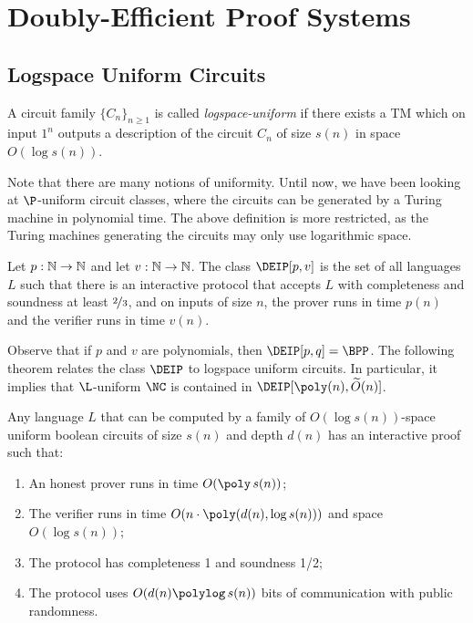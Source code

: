 \newcommand{\fH}{\mathbb{H}}

\chapter{Doubly-Efficient Proof Systems}
\label{lec:09}

\section{Logspace Uniform Circuits}

\begin{definition}\label{def:logspaceuniform}
  A circuit family $\{C_n\}_{n \geq 1}$ is called \emph{logspace-uniform} if
  there exists a TM which on input $1^n$ outputs a description of the circuit
  $C_n$ of size $s(n)$ in space $O(\log s(n))$.
\end{definition}

Note that there are many notions of uniformity. Until now, we have been
looking at $\P$-uniform circuit classes, where the circuits can be generated by
a Turing machine in polynomial time. The above definition is more restricted,
as the Turing machines generating the circuits may only use
logarithmic space.

\begin{definition}
  Let $p : \mathbb{N} \to \mathbb{N}$ and let $v : \mathbb{N} \to \mathbb{N}$. The class $\DEIP[p, v]$ is the
  set of all languages $L$ such that there is an interactive protocol that
  accepts $L$ with completeness and soundness at least $\nicefrac{2}{3}$, and on inputs
  of size $n$, the prover runs in time $p(n)$ and the verifier runs in time
  $v(n)$.
\end{definition}

Observe that if $p$ and $v$ are polynomials, then $\DEIP[p, q] = \BPP$. The
following theorem relates the class $\DEIP$ to logspace uniform circuits. In
particular, it implies that $\L$-uniform $\NC$ is contained in $\DEIP[\poly(n),
\widetilde{O}(n)]$.

\begin{theorem}\label{thm:main}
  Any language $L$ that can be computed by a family of $O(\log s(n))$-space
  uniform boolean circuits of size $s(n)$ and depth $d(n)$ has an interactive
  proof such that:
	\begin{enumerate}
		\item An honest prover runs in time $O(\poly\,{s(n)})$;
		\item The verifier runs in time $O(n \cdot \poly(d(n), \log s(n)))$ and space $O(\log s(n))$;
		\item The protocol has completeness 1 and soundness 1/2;
    \item The protocol uses $O(d(n)\polylog\,{s(n)})$ bits of communication with
      public randomness.
  \end{enumerate}
\end{theorem}


